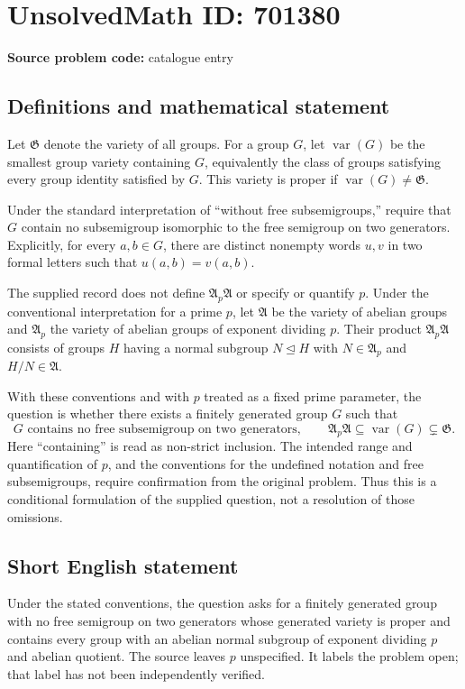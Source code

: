 \documentclass[11pt]{article}
\begin{document}
\section*{UnsolvedMath ID: 701380}
\textbf{Source problem code:} catalogue entry
\subsection{Definitions and mathematical statement}
Let \(\mathfrak G\) denote the variety of all groups. For a group \(G\), let \(\operatorname{var}(G)\) be the smallest group variety containing \(G\), equivalently the class of groups satisfying every group identity satisfied by \(G\). This variety is proper if \(\operatorname{var}(G)\ne\mathfrak G\).

Under the standard interpretation of ``without free subsemigroups,'' require that \(G\) contain no subsemigroup isomorphic to the free semigroup on two generators. Explicitly, for every \(a,b\in G\), there are distinct nonempty words \(u,v\) in two formal letters such that \(u(a,b)=v(a,b)\).

The supplied record does not define \(\mathfrak A_p\mathfrak A\) or specify or quantify \(p\). Under the conventional interpretation for a prime \(p\), let \(\mathfrak A\) be the variety of abelian groups and \(\mathfrak A_p\) the variety of abelian groups of exponent dividing \(p\). Their product \(\mathfrak A_p\mathfrak A\) consists of groups \(H\) having a normal subgroup \(N\trianglelefteq H\) with \(N\in\mathfrak A_p\) and \(H/N\in\mathfrak A\).

With these conventions and with \(p\) treated as a fixed prime parameter, the question is whether there exists a finitely generated group \(G\) such that
\[
G\text{ contains no free subsemigroup on two generators},
\qquad
\mathfrak A_p\mathfrak A\subseteq\operatorname{var}(G)\subsetneq\mathfrak G.
\]
Here ``containing'' is read as non-strict inclusion. The intended range and quantification of \(p\), and the conventions for the undefined notation and free subsemigroups, require confirmation from the original problem. Thus this is a conditional formulation of the supplied question, not a resolution of those omissions.
\subsection{Short English statement}
Under the stated conventions, the question asks for a finitely generated group with no free semigroup on two generators whose generated variety is proper and contains every group with an abelian normal subgroup of exponent dividing \(p\) and abelian quotient. The source leaves \(p\) unspecified. It labels the problem open; that label has not been independently verified.
\end{document}
